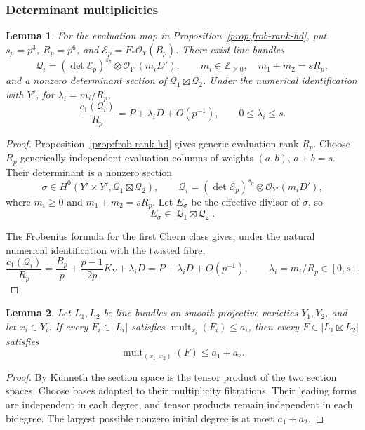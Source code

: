\documentclass[12pt,a4paper,psamsfonts]{amsart}
\theoremstyle{definition}
\theoremstyle{plain}
\newtheorem{lemma}{Lemma}[section]
\newcommand{\OO}{\mathcal O}
\newcommand{\mult}{\operatorname{mult}}
\begin{document}
\subsubsection{Determinant multiplicities}

\begin{lemma}\label{lem:determinant-line-bundles}
For the evaluation map in Proposition~\ref{prop:frob-rank-hd},
put $s_p=p^3$, $R_p=p^6$, and $\mathcal E_p=F_*\OO_Y(B_p)$.
There exist line bundles
\[
 \mathcal Q_i=(\det\mathcal E_p)^{s_p}\otimes\OO_{Y'}(m_iD'),
 \qquad m_i\in\mathbb Z_{\ge0},\quad m_1+m_2=sR_p,
\]
and a nonzero determinant section of $\mathcal Q_1\boxtimes\mathcal Q_2$.
Under the numerical identification with $Y'$, for $\lambda_i=m_i/R_p$,
\[
 \frac{c_1(\mathcal Q_i)}{R_p}=P+\lambda_iD+O(p^{-1}),
 \qquad0\le\lambda_i\le s.
\]
\end{lemma}
\begin{proof}
Proposition~\ref{prop:frob-rank-hd} gives generic evaluation
rank $R_p$. Choose $R_p$ generically independent evaluation
columns of weights $(a,b)$, $a+b=s$. Their determinant is
a nonzero section
\[
 \sigma\in H^0(Y'\times Y',\mathcal Q_1\boxtimes\mathcal Q_2),
 \qquad
 \mathcal Q_i=(\det\mathcal E_p)^{s_p}\otimes\OO_{Y'}(m_iD'),
\]
where $m_i\ge0$ and $m_1+m_2=sR_p$. Let $E_\sigma$ be the
effective divisor of $\sigma$, so
\[
 E_\sigma\in|\mathcal Q_1\boxtimes\mathcal Q_2|.
\]


The Frobenius formula for the first Chern class
\cite[Lemma~4.2]{Sun} gives, under the natural numerical
identification with the twisted fibre,
\[
 \frac{c_1(\mathcal Q_i)}{R_p}
 =\frac{B_p}{p}+\frac{p-1}{2p}K_Y+\lambda_iD
 =P+\lambda_iD+O(p^{-1}),\qquad
 \lambda_i=m_i/R_p\in[0,s].
\]
\end{proof}

\begin{lemma}\label{lem:product-multiplicity-bound}
Let $L_1,L_2$ be line bundles on smooth projective varieties
$Y_1,Y_2$, and let $x_i\in Y_i$. If every $F_i\in|L_i|$ satisfies
$\mult_{x_i}(F_i)\le a_i$, then every $F\in|L_1\boxtimes L_2|$
satisfies
\[
 \mult_{(x_1,x_2)}(F)\le a_1+a_2.
\]
\end{lemma}
\begin{proof}
By K\"unneth the section space is the tensor product of the two
section spaces. Choose bases adapted to their multiplicity
filtrations. Their leading forms are independent in each degree,
and tensor products remain independent in each bidegree.
The largest possible nonzero initial degree is at most $a_1+a_2$.
\end{proof}
\end{document}
